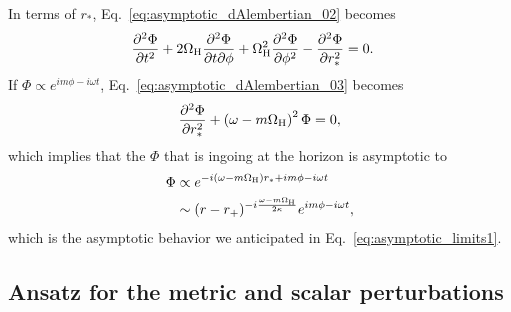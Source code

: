 \documentclass[aps,prx,amsmath,floats,floatfix,twocolumn,
  superscriptaddress,nofootinbib,showpacs]{revtex4-1}
\begin{document}
In terms of $r_*$, Eq.~\eqref{eq:asymptotic_dAlembertian_02} becomes 
\begin{equation}\label{eq:asymptotic_dAlembertian_03}
\begin{split}
& \frac{\partial^2 \Phi}{\partial t^2} + 2 \Omega_{\rm H} \frac{\partial^2 \Phi}{\partial t \partial \phi}  + \Omega_{\rm H}^2 \frac{\partial^2 \Phi}{\partial \phi^2} - \frac{\partial^2 \Phi}{\partial r_*^2 } = 0.
\end{split}
\end{equation}
If $\Phi \propto e^{i m \phi - i \omega t}$, Eq.~\eqref{eq:asymptotic_dAlembertian_03} becomes 
\begin{equation}
\frac{\partial^2 \Phi}{\partial r_*^2 } + \left( \omega - m \Omega_{\rm H}\right)^2 \Phi = 0, 
\end{equation}
which implies that the $\Phi$ that is ingoing at the horizon is asymptotic to
\begin{equation}\label{eq:asymptotic_behavior_horizon}
\begin{split}
\Phi & \propto e^{ - i \left( \omega - m \Omega_{\rm H} \right) r_* + i m \phi - i \omega t} \\
& \sim (r-r_+)^{-i\frac{\omega - m \Omega_{\rm H}}{2 \kappa}} e^{i m \phi - i \omega t}, 
\end{split}
\end{equation}
which is the asymptotic behavior we anticipated in Eq.~\eqref{eq:asymptotic_limits1}.


\subsection{Ansatz for the metric and scalar perturbations}
\label{sec:ansatz_summary}
\end{document}
